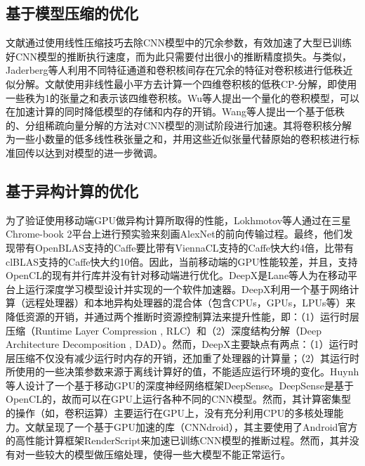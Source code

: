 \subsection{基于模型压缩的优化}
文献\cite{denton2014exploiting}通过使用线性压缩技巧去除CNN模型中的冗余参数，有效加速了大型已训练好CNN模型的推断执行速度，而为此只需要付出很小的推断精度损失。与\cite{denton2014exploiting}类似，Jaderberg等人\cite{jaderberg2014speeding}利用不同特征通道和卷积核间存在冗余的特征对卷积核进行低秩近似分解。文献\cite{lebedev2014speeding}使用非线性最小平方去计算一个四维卷积核的低秩CP-分解，即使用一些秩为1的张量之和表示该四维卷积核。Wu等人\cite{wu2016quantized}提出一个量化的卷积模型，可以在加速计算的同时降低模型的存储和内存的开销。Wang等人\cite{wang2016accelerating}提出一个基于低秩的、分组稀疏向量分解的方法对CNN模型的测试阶段进行加速。其将卷积核分解为一些小数量的低多线性秩张量之和，并用这些近似张量代替原始的卷积核进行标准回传以达到对模型的进一步微调。
\subsection{基于异构计算的优化}
为了验证使用移动端GPU做异构计算所取得的性能，Lokhmotov等人\cite{lokhmotov2016optimizing}通过在三星 Chrome-book 2平台上进行预实验来刻画AlexNet的前向传输过程。最终，他们发现带有OpenBLAS\cite{xianyi2012openblas}支持的Caffe\cite{jia2014caffe}要比带有ViennaCL\cite{rupp2010viennacl}支持的Caffe快大约4倍，比带有clBLAS\cite{nugteren2017clblast}支持的Caffe快大约10倍。因此，当前移动端的GPU性能较差，并且，支持OpenCL\cite{stone2010opencl}的现有并行库并没有针对移动端进行优化。DeepX是Lane等人\cite{lane2016deepx}为在移动平台上运行深度学习模型设计并实现的一个软件加速器。DeepX利用一个基于网络计算（远程处理器）和本地异构处理器的混合体（包含CPUs，GPUs，LPUs等）来降低资源的开销，并通过两个推断时资源控制算法来提升性能，即：（1）运行时层压缩（Runtime Layer Compression , RLC）和（2）深度结构分解（Deep Architecture Decomposition , DAD）。然而，DeepX主要缺点有两点：（1）运行时层压缩不仅没有减少运行时内存的开销，还加重了处理器的计算量；（2）其运行时所使用的一些决策参数来源于离线计算好的值，不能适应运行环境的变化。Huynh等人\cite{huynh2016deepsense}设计了一个基于移动GPU的深度神经网络框架DeepSense。DeepSense是基于OpenCL的，故而可以在GPU上运行各种不同的CNN模型。然而，其计算密集型的操作（如，卷积运算）主要运行在GPU上，没有充分利用CPU的多核处理能力。文献\cite{latifi2016cnndroid}呈现了一个基于GPU加速的库（CNNdroid），其主要使用了Android官方的高性能计算框架RenderScript来加速已训练CNN模型的推断过程。然而，其并没有对一些较大的模型做压缩处理，使得一些大模型不能正常运行。
